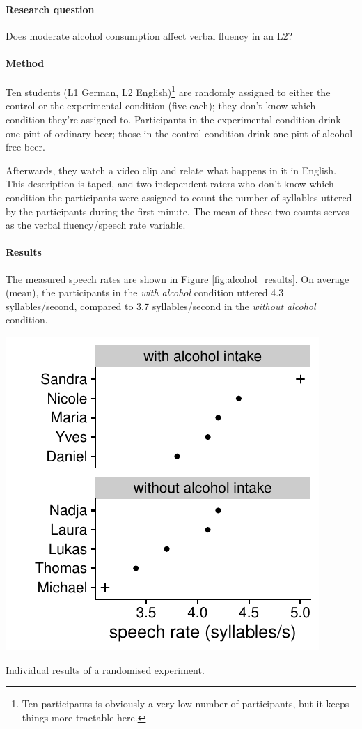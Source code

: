 \documentclass[a4paper]{tufte-book}\usepackage[]{graphicx}\usepackage[]{xcolor}
\begin{document}
\paragraph{Research question} Does moderate alcohol consumption affect verbal fluency in an L2?

\paragraph{Method}
Ten students (L1 German, L2 English)\footnote{Ten participants is obviously a very low number of participants, but it keeps things more tractable here.}
are randomly assigned to either the control or the experimental condition (five each);
they don't know which condition they're assigned to.
Participants in the experimental condition drink one pint of ordinary beer;
those in the control condition drink one pint of alcohol-free beer.

Afterwards, they watch a video clip and relate what happens in it in English.
This description is taped,
and two independent raters who don't know which condition the participants were assigned to
count the number of syllables uttered by the participants during the first minute.
The mean of these two counts serves as the verbal fluency/speech rate variable.

\paragraph{Results}
The measured speech rates are shown in Figure \ref{fig:alcohol_results}.
On average (mean), the participants in the \textit{with alcohol} condition
uttered 4.3 syllables/second,
compared to 3.7 syllables/second in the \textit{without alcohol} condition.




\begin{marginfigure}
\includegraphics[width=\textwidth]{figure/alcohol_results}
\caption{Individual results of a randomised experiment.}
\label{fig:alcohol_results}
\end{marginfigure}
\end{document}
